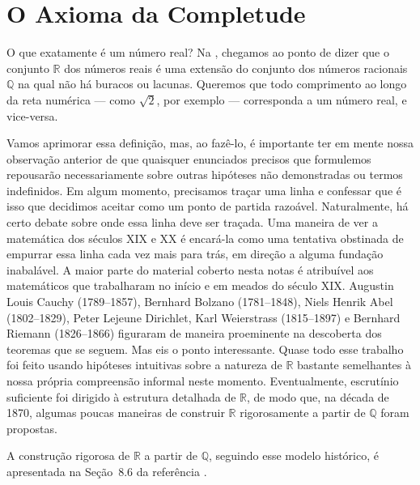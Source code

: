 
\section{O Axioma da Completude}\label{sec:axioma-completude}

O que exatamente é um número real? Na , chegamos ao ponto de dizer que o conjunto $\mathbb{R}$ dos números reais é uma extensão do conjunto dos números racionais $\mathbb{Q}$ na qual não há buracos ou lacunas. Queremos que todo comprimento ao longo da reta numérica --- como $\sqrt{2}$, por exemplo --- corresponda a um número real, e vice-versa. 

Vamos aprimorar essa definição, mas, ao fazê-lo, é importante ter em mente nossa observação anterior de que quaisquer enunciados precisos que formulemos repousarão necessariamente sobre outras hipóteses não demonstradas ou termos indefinidos. Em algum momento, precisamos traçar uma linha e confessar que é isso que decidimos aceitar como um ponto de partida razoável. Naturalmente, há certo debate sobre onde essa linha deve ser traçada. Uma maneira de ver a matemática dos séculos XIX e XX é encará-la como uma tentativa obstinada de empurrar essa linha cada vez mais para trás, em direção a alguma fundação inabalável. A maior parte do material coberto nesta notas é atribuível aos matemáticos que trabalharam no início e em meados do século XIX. Augustin Louis Cauchy (1789--1857), Bernhard Bolzano (1781--1848), Niels Henrik Abel (1802--1829), Peter Lejeune Dirichlet, Karl Weierstrass (1815--1897) e Bernhard Riemann (1826--1866) figuraram de maneira proeminente na descoberta dos teoremas que se seguem. Mas eis o ponto interessante. Quase todo esse trabalho foi feito usando hipóteses intuitivas sobre a natureza de $\mathbb{R}$ bastante semelhantes à nossa própria compreensão informal neste momento. Eventualmente, escrutínio suficiente foi dirigido à estrutura detalhada de $\mathbb{R}$, de modo que, na década de 1870, algumas poucas maneiras de construir $\mathbb{R}$ rigorosamente a partir de $\mathbb{Q}$ foram propostas.

A construção rigorosa de $\mathbb{R}$ a partir de $\mathbb{Q}$, seguindo esse modelo histórico, 
é apresentada na Seção~8.6 da referência \cite{MR3331079}. 


